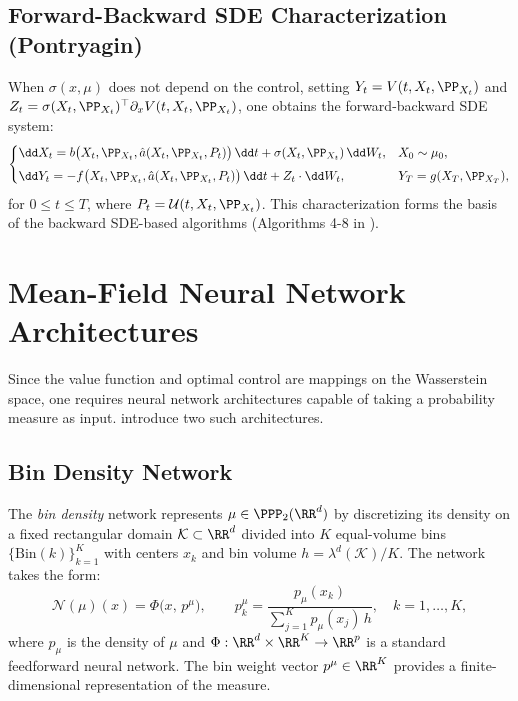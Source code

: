 \documentclass[11pt]{article}
\begin{document}
\subsection{Forward-Backward SDE Characterization (Pontryagin)}

When $\sigma(x,\mu)$ does not depend on the control, setting $Y_t = V(t, X_t, \PP_{X_t})$ and $Z_t = \sigma(X_t, \PP_{X_t})^\top \partial_x V(t, X_t, \PP_{X_t})$, one obtains the forward-backward SDE system:
\begin{equation}\label{eq:fbsde}
  \begin{cases}
    \dd X_t = b\big(X_t, \PP_{X_t}, \hat{a}(X_t, \PP_{X_t}, P_t)\big)\,\dd t + \sigma(X_t, \PP_{X_t})\,\dd W_t, & X_0 \sim \mu_0, \\[4pt]
    \dd Y_t = -f\big(X_t, \PP_{X_t}, \hat{a}(X_t, \PP_{X_t}, P_t)\big)\,\dd t + Z_t \cdot \dd W_t, & Y_T = g(X_T, \PP_{X_T}),
  \end{cases}
\end{equation}
for $0 \leq t \leq T$, where $P_t = \mathcal{U}(t, X_t, \PP_{X_t})$. This characterization forms the basis of the backward SDE-based algorithms (Algorithms 4-8 in \citet{pham2024mfnn}).


\section{Mean-Field Neural Network Architectures}\label{sec:appendix-mfnn}

Since the value function and optimal control are mappings on the Wasserstein space, one requires neural network architectures capable of taking a probability measure as input. \citet{pham2024mfnn} introduce two such architectures.

\subsection{Bin Density Network}

The \emph{bin density} network represents $\mu \in \PPP_2(\RR^d)$ by discretizing its density on a fixed rectangular domain $\mathcal{K} \subset \RR^d$ divided into $K$ equal-volume bins $\{\mathrm{Bin}(k)\}_{k=1}^K$ with centers $x_k$ and bin volume $h = \lambda^d(\mathcal{K})/K$. The network takes the form:
\begin{equation}\label{eq:bin-density}
  \mathcal{N}(\mu)(x) = \Phi\big(x, \, p^\mu\big), \qquad p^\mu_k = \frac{p_\mu(x_k)}{\sum_{j=1}^K p_\mu(x_j)\,h}, \quad k = 1, \ldots, K,
\end{equation}
where $p_\mu$ is the density of $\mu$ and $\Phi : \RR^d \times \RR^K \to \RR^p$ is a standard feedforward neural network. The bin weight vector $p^\mu \in \RR^K$ provides a finite-dimensional representation of the measure.
\end{document}
